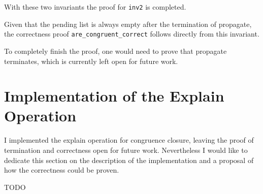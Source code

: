 With these two invariants the proof for \lstinline{inv2} is completed.

Given that the pending list is always empty after the termination of propagate, the correctness proof \lstinline{are_congruent_correct} follows directly from this invariant.

To completely finish the proof, one would need to prove that propagate terminates, which is currently left open for future work.

\section{Implementation of the Explain Operation}

I implemented the explain operation for congruence closure, leaving the proof of termination and correctness open for future work. Nevertheless I would like to dedicate this section on the description of the implementation and a proposal of how the correctness could be proven.

TODO